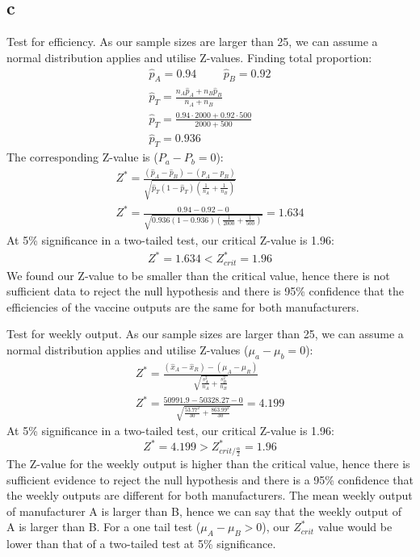 \documentclass[11pt]{article}
\numberwithin{equation}{section}
\begin{document}
\subsection{c}
Test for efficiency. As our sample sizes are larger than 25, we can assume a normal distribution applies and utilise Z-values. Finding total proportion:
\begin{gather}
    \hat{p}_A = 0.94 \hspace{1cm} \hat{p}_B = 0.92\\
    \hat{p}_T = \frac{n_A \hat{p}_A + n_B \hat{p}_B}{n_A + n_B}\\
    \hat{p}_T = \frac{0.94\cdot 2000 + 0.92 \cdot 500}{2000 + 500}\\
    \hat{p}_T = 0.936
\end{gather}
The corresponding Z-value is ($P_a - P_b = 0$):
\begin{gather}
    Z^* = \frac{\left(\hat{p}_A - \hat{p}_B\right) - \left(p_A - p_B\right)}{\sqrt{\hat{p}_T \left(1-\hat{p}_T\right)\left(\frac{1}{n_A} + \frac{1}{n_B}\right)}}\\
    Z^* = \frac{0.94 -0.92 - 0}{\sqrt{0.936 \left(1-0.936\right)\left(\frac{1}{2000} + \frac{1}{500}\right)}} = 1.634
\end{gather}
At 5\% significance in a two-tailed test, our critical Z-value is 1.96:
\begin{eqnarray}
    Z^* = 1.634 < Z^*_{crit} = 1.96
\end{eqnarray}
We found our Z-value to be smaller than the critical value, hence there is not sufficient data to reject the null hypothesis and there is 95\% confidence that the efficiencies of the vaccine outputs are the same for both manufacturers. 

Test for weekly output. As our sample sizes are larger than 25, we can assume a normal distribution applies and utilise Z-values ($\mu_a - \mu_b = 0$):
\begin{gather}
    Z^* = \frac{\left(\hat{x}_A - \hat{x}_R\right)-\left(\mu_A - \mu_R\right)}{\sqrt{\frac{s_A^2}{n_A} + \frac{s_B^2}{n_B}}}\\
    Z^* = \frac{50991.9 - 50328.27 - 0}{\sqrt{\frac{53.77^2}{30} + \frac{863.99^2}{30}}} = 4.199
\end{gather}
At 5\% significance in a two-tailed test, our critical Z-value is 1.96:
\begin{equation}
    Z^* = 4.199 > Z^*_{crit/\frac{\alpha}{2}} = 1.96
\end{equation} 
The Z-value for the weekly output is higher than the critical value, hence there is sufficient evidence to reject the null hypothesis and there is a 95\% confidence that the weekly outputs are different for both manufacturers. The mean weekly output of manufacturer A is larger than B, hence we can say that the weekly output of A is larger than B. For a one tail test ($\mu_A - \mu_B > 0$), our $Z^*_{crit}$ value would be lower than that of a two-tailed test at 5\% significance.
\end{document}
